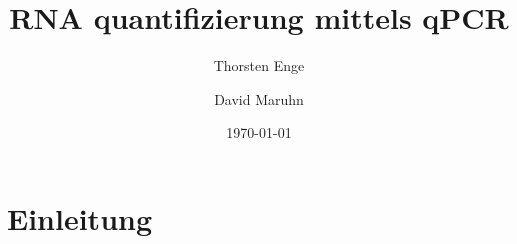\documentclass{article}
\begin{document}
\title{RNA quantifizierung mittels qPCR}
\author{Thorsten Enge \and David Maruhn}
\date{\today}
\maketitle

\section{Einleitung}
\end{document}

